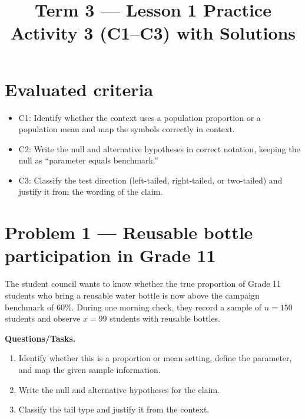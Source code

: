 \makeatletter
{}
\makeatother	



\title{Term 3 --- Lesson 1 Practice Activity 3 (C1--C3) with Solutions}
\author{}
\date{}


	
	\maketitle

	\setcounter{tocdepth}{1}
	\setcounter{secnumdepth}{2}
	\tableofcontents

	\section*{Evaluated criteria}
	\begin{itemize}
		\item C1: Identify whether the context uses a population proportion or a population mean and map the symbols correctly in context.
		\item C2: Write the null and alternative hypotheses in correct notation, keeping the null as ``parameter equals benchmark.''
		\item C3: Classify the test direction (left-tailed, right-tailed, or two-tailed) and justify it from the wording of the claim.
	\end{itemize}

	\section{Problem 1 --- Reusable bottle participation in Grade 11}
	The student council wants to know whether the true proportion of Grade 11 students who bring a reusable water bottle is now above the campaign benchmark of 60\%. During one morning check, they record a sample of \(n=150\) students and observe \(x=99\) students with reusable bottles.
	
	\textbf{Questions/Tasks.}
	\begin{enumerate}
		\item[(C1)] Identify whether this is a proportion or mean setting, define the parameter, and map the given sample information.
		\item[(C2)] Write the null and alternative hypotheses for the claim.
		\item[(C3)] Classify the tail type and justify it from the context.
	\end{enumerate}
	
